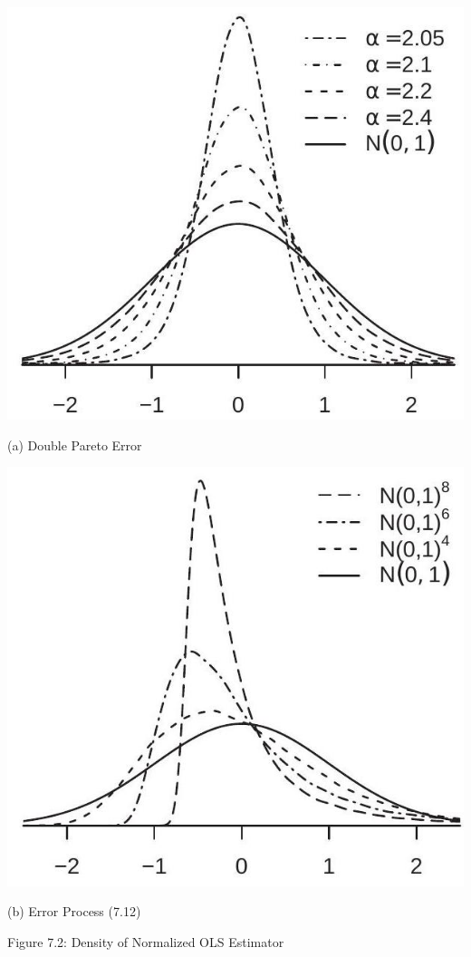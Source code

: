 \documentclass[10pt]{article}
\begin{document}
\includegraphics[max width=\textwidth]{2022_09_17_4fdd33cd9a12f3020189g-07}

(a) Double Pareto Error

\includegraphics[max width=\textwidth]{2022_09_17_4fdd33cd9a12f3020189g-07(1)}

(b) Error Process (7.12)

Figure 7.2: Density of Normalized OLS Estimator
\end{document}
